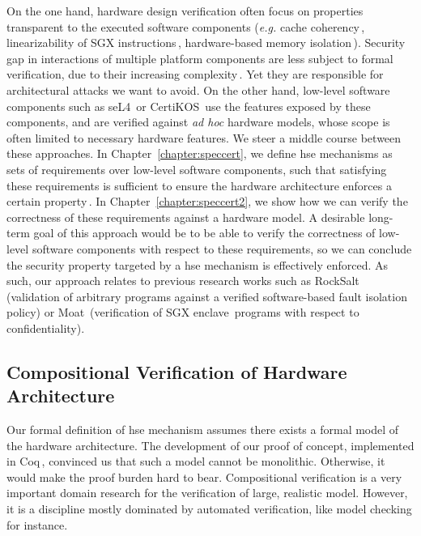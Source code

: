 On the one hand, hardware design verification often focus on properties
transparent to the executed software components (\emph{e.g.} cache
coherency\,\cite{stern1995cachecoherence}, linearizability of SGX
instructions\,\cite{leslie2015sgx}, hardware-based memory
isolation\,\cite{lie2003xom}).
%
Security gap in interactions of multiple platform components are less subject to
formal verification, due to their increasing
complexity\,\cite{potlapally2011hardwaresecurity}.
%
Yet they are responsible for architectural attacks we want to avoid.
%
On the other hand, low-level software components such as
seL4\,\cite{klein2009sel4} or CertiKOS\,\cite{gu2016certikos} use the features
exposed by these components, and are verified against \emph{ad hoc} hardware
models, whose scope is often limited to necessary hardware features.
%
We steer a middle course between these approaches.
%
In Chapter~\ref{chapter:speccert}, we define \ac{hse} mechanisms as sets of
requirements over low-level software components, such that satisfying these
requirements is sufficient to ensure the hardware architecture enforces a
certain property\,\cite{letan2016speccert}.
%
In Chapter~\ref{chapter:speccert2}, we show how we can verify the correctness of
these requirements against a hardware model.
%
A desirable long-term goal of this approach would be to be able to verify the
correctness of low-level
software components with respect to these requirements, so we can conclude the
security property targeted by a \ac{hse} mechanism is effectively enforced.
%
As such, our approach relates to previous research works such as
RockSalt\,\cite{morrisett2012rocksalt} (validation of arbitrary programs against
a verified software-based fault isolation\,\cite{wahbe1994sfi} policy) or
Moat\,\cite{sinha2015moat} (verification of SGX
enclave\,\cite{costan2016sgxexplained} programs with respect to
confidentiality).

\subsection{Compositional Verification of Hardware Architecture}

Our formal definition of \ac{hse} mechanism assumes there exists a formal model
of the hardware architecture.
%
The development of our proof of concept, implemented in
Coq\,\cite{letan2016speccertcode}, convinced us that such a model cannot be
monolithic.
%
Otherwise, it would make the proof burden hard to bear.
%
Compositional verification is a very important domain research for the
verification of large, realistic model.
%
However, it is a discipline mostly dominated by automated verification, like
model checking for instance.

